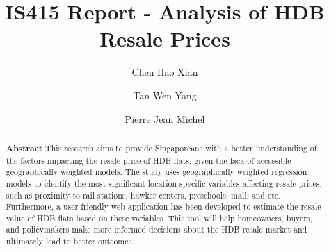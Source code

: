 \documentclass[manuscript,screen]{acmart}
\begin{document}
\title{IS415 Report - Analysis of HDB Resale Prices}



  \author{Chen Hao Xian}
  
    \author{Tan Wen Yang}
  
    \author{Pierre Jean Michel}
  
      

\begin{abstract}
\textbf{Abstract} This research aims to provide Singaporeans with a
better understanding of the factors impacting the resale price of HDB
flats, given the lack of accessible geographically weighted models. The
study uses geographically weighted regression models to identify the
most significant location-specific variables affecting resale prices,
such as proximity to rail stations, hawker centers, preschools, mall,
and etc. Furthermore, a user-friendly web application has been developed
to estimate the resale value of HDB flats based on these variables. This
tool will help homeowners, buyers, and policymakers make more informed
decisions about the HDB resale market and ultimately lead to better
outcomes.    
\end{abstract}


\end{document}
